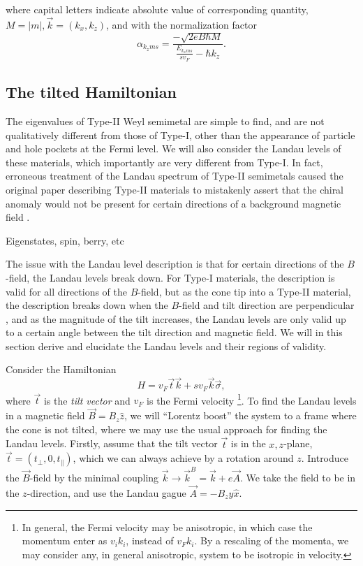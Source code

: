 where capital letters indicate absolute value of corresponding quantity, $M=|m|, \vec{k} = (k_x, k_z)$, and with the normalization factor
\begin{equation}
  \alpha _{k_z m s} = \frac{-\sqrt{2eB\hbar M}}{\frac{E_{k_z m s}}{s v_{F}} - \hbar  k_z}.
\end{equation}

\subsection{The tilted Hamiltonian}
The eigenvalues of Type-II Weyl semimetal are simple to find, and are not qualitatively different from those of Type-I, other than the appearance of particle and hole pockets at the Fermi level.
We will also consider the Landau levels of these materials, which importantly are very different from Type-I.
In fact, erroneous treatment of the Landau spectrum of Type-II semimetals caused the original paper describing Type-II materials to mistakenly assert that the chiral anomaly would not be present for certain directions of a background magnetic field \cite{soluyanovTypeIIWeylSemimetals2015}\cite{sharmaChiralAnomalyLongitudinal2017}.

Eigenstates, spin, berry, etc

The issue with the Landau level description is that for certain directions of the \(B\)-field, the Landau levels break down.
For Type-I materials, the description is valid for all directions of the \(B\)-field, but as the cone tip into a Type-II material, the description breaks down when the \(B\)-field and tilt direction are perpendicular \cite{sharmaChiralAnomalyLongitudinal2017}, and as the magnitude of the tilt increases, the Landau levels are only valid up to a certain angle between the tilt direction and magnetic field.
We will in this section derive and elucidate the Landau levels and their regions of validity.

Consider the Hamiltonian
\begin{equation}
  \label{eq:35}
  H = v_{F} \vec{t} \vec{k} + s v_{F} \vec{k} \vec{\sigma},
\end{equation}
where \(\vec{t}\) is the \emph{tilt vector} and \( v_F \) is the Fermi velocity
\footnote{In general, the Fermi velocity may be anisotropic, in which case the momentum enter as \( v_i k_i \), instead of \( v_F k_i \). By a rescaling of the momenta, we may consider any, in general anisotropic, system to be isotropic in velocity.}.
To find the Landau levels in a magnetic field \(\vec{B} = B_{z}\hat{z} \), we will ``Lorentz boost'' the system to a frame where the cone is not tilted, where we may use the usual approach for finding the Landau levels.
Firstly, assume that the tilt vector \(\vec{ t }\) is in the \(x,z\)-plane, \(\vec{t} = (t_{\perp}, 0, t_{\parallel})\), which we can always achieve by a rotation around \(z\).
Introduce the \(\vec{B}\)-field by the minimal coupling \(\vec{k} \to \vec{k}^B = \vec{k} + e \vec{A}\).
We take the field to be in the \( z \)-direction, and use the Landau gague \(\vec{A} = -B_{z}y \hat{x}\).

